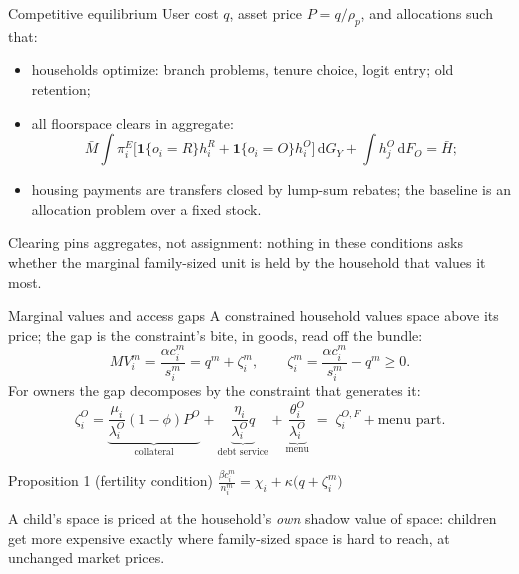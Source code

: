 \documentclass[11pt,aspectratio=169]{beamer}
\newcommand{\dd}{\mathrm d}
\newcommand{\1}{\mathbf 1}
\newcommand{\Mbar}{\bar M}
\begin{document}
\begin{frame}{Competitive equilibrium}
\small
User cost $q$, asset price $P=q/\rho_p$, and allocations such that:
\begin{itemize}\setlength{\itemsep}{0.3em}
  \item households optimize: branch problems, tenure choice, logit entry; old retention;
  \item all floorspace clears in aggregate:
  \[
  \Mbar\!\int\!\pi_i^E\big[\1\{o_i{=}R\}h_i^R+\1\{o_i{=}O\}h_i^O\big]\,\dd G_Y
  +\!\int\! h_j^O\,\dd F_O=\bar H;
  \]
  \item housing payments are transfers closed by lump-sum rebates; the baseline is an allocation problem over a fixed stock.
\end{itemize}
\medskip
Clearing pins aggregates, not assignment: nothing in these conditions asks whether the marginal family-sized unit is held by the household that values it most.
\end{frame}

\begin{frame}{Marginal values and access gaps}
\small
A constrained household values space above its price; the gap is the constraint's bite, in goods, read off the bundle:
\[
MV_i^m=\frac{\alpha c_i^m}{s_i^m}=q^m+\zeta_i^m,
\qquad
\zeta_i^m=\frac{\alpha c_i^m}{s_i^m}-q^m\ge0 .
\]
For owners the gap decomposes by the constraint that generates it:
\[
\zeta_i^O
=
\underbrace{\frac{\mu_i}{\lambda_i^O}(1-\phi)P^O}_{\text{collateral}}
+
\underbrace{\frac{\eta_i}{\lambda_i^O}q}_{\text{debt service}}
+
\underbrace{\frac{\theta_i^O}{\lambda_i^O}}_{\text{menu}}
\;=\;
\zeta_i^{O,F}+\text{menu part}.
\]
\begin{block}{Proposition 1 (fertility condition)}
\centering
$\displaystyle \frac{\beta c_i^m}{n_i^m}=\chi_i+\kappa\big(q+\zeta_i^m\big)$
\end{block}
\smallskip
A child's space is priced at the household's \emph{own} shadow value of space: children get more expensive exactly where family-sized space is hard to reach, at unchanged market prices.
\end{frame}
\end{document}
